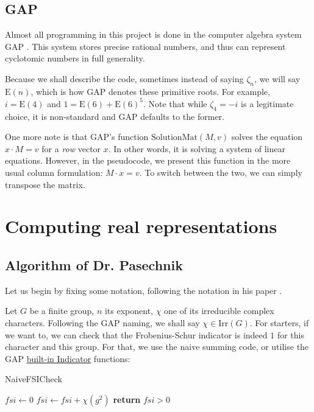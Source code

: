\documentclass[11pt]{article}
\begin{document}
\subsection{GAP}

Almost all programming in this project is done in the computer algebra system GAP \cite{GAP4}.
This system stores precise rational numbers, and thus can represent cyclotomic numbers in full generality.

Because we shall describe the code, sometimes instead of saying $\zeta_n$, we will say $\text{E}(n)$,
which is how GAP denotes these primitive roots. For example, $i = \text{E}(4)$ and $1 = \text{E}(6) + \text{E}(6)^5$.
Note that while $\zeta_4 = -i$ is a legitimate choice, it is non-standard and GAP defaults to the former.

One more note is that GAP's function $\text{SolutionMat}(M, v)$ solves the equation
$x \cdot M = v$ for a \textit{row} vector $x$. In other words, it is solving a system
of linear equations. However, in the pseudocode, we present this function in the
more usual column formulation: $M \cdot x = v$. To switch between
the two, we can simply transpose the matrix.

\newpage

\section{Computing real representations}

\subsection{Algorithm of Dr. Pasechnik}

Let us begin by fixing some notation, following the notation in his paper \cite{Pas21}.

Let $G$ be a finite group, $n$ its exponent, $\chi$ one of its irreducible complex characters. 
Following the GAP naming, we shall say $\chi \in \text{Irr}(G)$. For starters, if we want to,
we can check that the Frobenius-Schur indicator is indeed $1$ for this character and this group.
For that, we use the naive summing code, or utilise the GAP
\href{https://docs.gap-system.org/doc/ref/chap71_mj.html#X7FD3D3047DE6381E}{built-in Indicator} functions:

\begin{algorithm}
  \caption{NaiveFSICheck}
  \begin{algorithmic}
    \State $fsi \gets 0$
      \State $fsi \gets fsi + \chi(g^2)$
    \EndFor
    \State \textbf{return} $fsi > 0$
  \end{algorithmic}
\end{algorithm}
\end{document}
